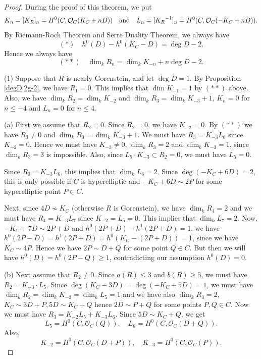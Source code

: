 \documentclass[12pt]{amsart}
\theoremstyle{definition}
\theoremstyle{remark}
\numberwithin{equation}{section}
\newcommand{\KiR}{{K_R}^{-1}}
\newcommand{\cO}{\mathcal O}
\renewcommand{\:}{\colon}
\begin{document}
\begin{proof} 
During the proof of this theorem, we put 
\[K_n = [K_R]_n = H^0(C, \cO_C(K_C+nD))\quad {\rm and} \quad  L_n = [\KiR]_n = 
H^0(C, \cO_C(- K_C+nD)).
\] 
By Riemann-Roch Theorem and Serre Duality Theorem, we always have 
\[
(*) \quad h^0(D)-h^0(K_C-D)= \deg D - 2.
\]
Hence we always have 
\[
(**) \quad \dim_k R_n = \dim_k K_{-n} + n \deg D -2.
\] 

\par \vspace{1mm}
(1) Suppose that $R$ is nearly Gorenstein, and let $\deg D =1$.  By Proposition \ref{degD|2g-2}, we have $R_1 =0$. This implies that 
$\dim K_{-1}=1$ by $(**)$ above. 
Also, we have $\dim_k R_2 = \dim_k K_{-2}$ and $\dim_k R_3 
= \dim_k K_{-3} +1$, 
$K_n = 0$ for $n\le -4$ and $L_n =0$ for $n\le 4$.  

\par 
(a) First we assume that $R_2= 0$. 
Since $R_2=0$, we have $K_{-2}=0$.  
By $(**)$ we have $R_3 \ne 0$ and 
$\dim_k R_3 = \dim_k K_{-3}+1$. 
We must have $R_3 = K_{-3}L_6$ since $K_{-2}=0$. 
Hence we must have $K_{-3}\ne 0$,  
$\dim_k R_3=2$ and $\dim_k K_{-3}=1$, since $\dim_k R_3=3$ is impossible. 
Also, since 
$L_5\cdot K_{-3}
\subset R_2 =0$, we must have $L_5=0$. 
\par
Since $R_3 = K_{-3}L_6$, this implies that $\dim_k L_6=2$. 
Since 
$\deg (-K_C + 6D)=2$, 
this is only possible if $C$ is hyperelliptic and $-K_C + 6D \sim 2P$ for some hyperelliptic 
point $P\in C$. 
\par
Next, since $4D \not\sim K_C$ (otherwise $R$ is Gorenstein), we have $\dim_k R_4=2$
 and we must have $R_4 = K_{-3}L_7$ since $K_{-2}=L_5=0$. This implies that
  $\dim_k L_7=2$. 
Now, $-K_C +7D \sim 2P +D$ and $h^0(2P+D) - h^1(2P+D)=1$, we have 
$h^0(2P -D)=h^1(2P+D)= h^0(K_C -(2P+D))= 1$, since we have $K_C \sim 4P$. 
Hence we have $2P \sim D + Q$ for some point $Q\in C$. But then we will have            
$h^0(D) = h^0 (2P - Q) \ge 1$, contradicting our assumption $h^0(D)=0$.

 
\par \vspace{1mm} 
(b) Next assume that $R_2 \ne 0$. Since $a(R)\le 3$ and $b(R)\ge 5$, we must have 
$R_2 = K_{-3}\cdot L_5$. Since $\deg (K_C -3D) 
=\deg (-K_C + 5D) = 1$, we must have 
$\dim_k R_2=\dim_k K_{-3}=\dim_k L_5=1$ and we have also 
$\dim_k R_3 = 2$, $K_C \sim 3D+P, 5D \sim K_C + Q$ 
hence $2D \sim P+Q$ for some points 
$P, Q \in C$.  
Now we must have $R_3 = K_{-2}L_5 + K_{-3}L_6$. 
Since $5D\sim K_C+Q$, we get
\[
L_5 =H^0(C,\cO_C(Q)), \quad  
L_6= H^0(C,\cO_C(D+Q)).
\] 
Also, 
\[
K_{-2}=H^0(C,\cO_C(D+P)), \quad K_{-3}=H^0(C,\cO_C(P)). 
\]


\end{proof}
\end{document}
